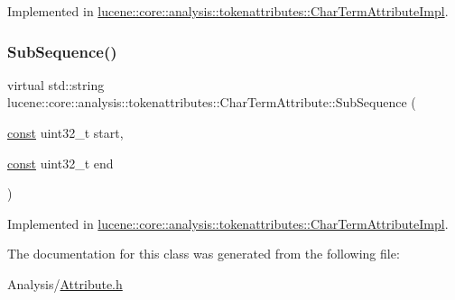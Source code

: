 Implemented in \mbox{\hyperlink{classlucene_1_1core_1_1analysis_1_1tokenattributes_1_1CharTermAttributeImpl_a752c93bfaa290094349858306468c9a9}{lucene\+::core\+::analysis\+::tokenattributes\+::\+Char\+Term\+Attribute\+Impl}}.

\mbox{\label{classlucene_1_1core_1_1analysis_1_1tokenattributes_1_1CharTermAttribute_af97534d3a549afbbddd5f64b97efc5a4}} 
\subsubsection{\texorpdfstring{Sub\+Sequence()}{SubSequence()}}
{\footnotesize\ttfamily virtual std\+::string lucene\+::core\+::analysis\+::tokenattributes\+::\+Char\+Term\+Attribute\+::\+Sub\+Sequence (\begin{DoxyParamCaption}\item[{\mbox{\hyperlink{ZlibCrc32_8h_a2c212835823e3c54a8ab6d95c652660e}{const}} uint32\+\_\+t}]{start,  }\item[{\mbox{\hyperlink{ZlibCrc32_8h_a2c212835823e3c54a8ab6d95c652660e}{const}} uint32\+\_\+t}]{end }\end{DoxyParamCaption})\hspace{0.3cm}{\ttfamily [pure virtual]}}



Implemented in \mbox{\hyperlink{classlucene_1_1core_1_1analysis_1_1tokenattributes_1_1CharTermAttributeImpl_a286d2dd38ce24fb0da4c077e8f06bb25}{lucene\+::core\+::analysis\+::tokenattributes\+::\+Char\+Term\+Attribute\+Impl}}.



The documentation for this class was generated from the following file\+:\begin{DoxyCompactItemize}
\item 
Analysis/\mbox{\hyperlink{Analysis_2Attribute_8h}{Attribute.\+h}}\end{DoxyCompactItemize}
